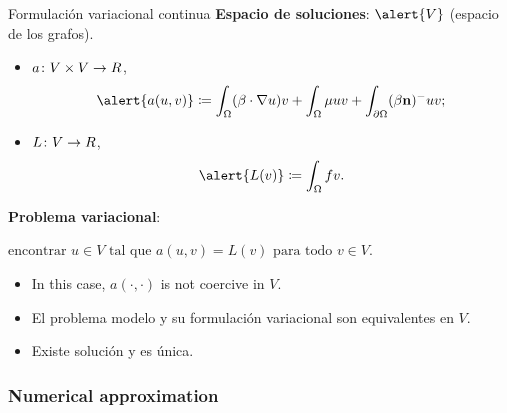 	\begin{frame}{Formulación variacional continua}
	\textbf{Espacio de soluciones}: $\alert{V}$ (espacio de los grafos).
	\begin{itemize}\itemsep1em
		\item $a\colon V\times V\to \relax R$, $$\alert{a(u,v)}\coloneqq\int_\Omega(\beta\cdot\nabla u)v+\int_\Omega\mu u v+\int_{\partial\Omega}(\beta\mathbf{n})^-uv;$$
		\item $L\colon V\to\relax R$, $$\alert{L(v)}\coloneqq\int_\Omega f v.$$
	\end{itemize}
	\textbf{Problema variacional}:
	\begin{block}{}
		\begin{center}
			$\text{encontrar }u\in V\text{ tal que }a(u,v)=L(v)\text{ para todo } v\in V.$
		\end{center}
	\end{block}
	
	\begin{itemize}\itemsep1em
		\item In this case, $a(\cdot,\cdot)$ is \alert{not coercive in $V$}.
		\item El problema modelo y su formulación variacional son \alert{equivalentes} en $V$.
		\item Existe solución y es única.
	\end{itemize}
	
	\end{frame}

\subsubsection{Numerical approximation}


